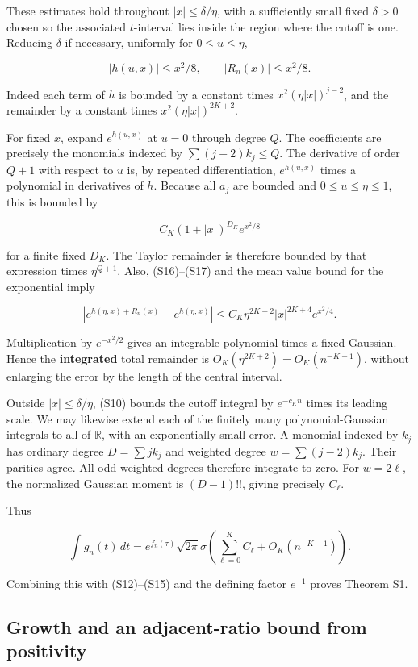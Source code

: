 These estimates hold throughout \(|x|\le\delta/\eta\), with a
sufficiently small fixed \(\delta>0\) chosen so the associated
\(t\)-interval lies inside the region where the cutoff is one. Reducing
\(\delta\) if necessary, uniformly for \(0\le u\le\eta\),

\[
 |h(u,x)|\le x^2/8,\qquad |R_n(x)|\le x^2/8. \tag{S17}
\]

Indeed each term of \(h\) is bounded by a constant times
\(x^2(\eta|x|)^{j-2}\), and the remainder by a constant times
\(x^2(\eta|x|)^{2K+2}\).

For fixed \(x\), expand \(e^{h(u,x)}\) at \(u=0\) through degree \(Q\).
The coefficients are precisely the monomials indexed by
\(\sum(j-2)k_j\le Q\). The derivative of order \(Q+1\) with respect to
\(u\) is, by repeated differentiation, \(e^{h(u,x)}\) times a polynomial
in derivatives of \(h\). Because all \(a_j\) are bounded and
\(0\le u\le\eta\le1\), this is bounded by

\[
 C_K(1+|x|)^{D_K}e^{x^2/8}
\]

for a finite fixed \(D_K\). The Taylor remainder is therefore bounded by
that expression times \(\eta^{Q+1}\). Also, (S16)--(S17) and the mean
value bound for the exponential imply

\[
 |e^{h(\eta,x)+R_n(x)}-e^{h(\eta,x)}|
 \le C_K\eta^{2K+2}|x|^{2K+4}e^{x^2/4}.
\]

Multiplication by \(e^{-x^2/2}\) gives an integrable polynomial times a
fixed Gaussian. Hence the \textbf{integrated} total remainder is
\(O_K(\eta^{2K+2})=O_K(n^{-K-1})\), without enlarging the error by the
length of the central interval.

Outside \(|x|\le\delta/\eta\), (S10) bounds the cutoff integral by
\(e^{-c_K n}\) times its leading scale. We may likewise extend each of
the finitely many polynomial-Gaussian integrals to all of \(\mathbb R\),
with an exponentially small error. A monomial indexed by \(k_j\) has
ordinary degree \(D=\sum jk_j\) and weighted degree \(w=\sum(j-2)k_j\).
Their parities agree. All odd weighted degrees therefore integrate to
zero. For \(w=2\ell\), the normalized Gaussian moment is \((D-1)!!\),
giving precisely \(C_\ell\).

Thus

\[
 \int g_n(t)\,dt=e^{f_n(\tau)}\sqrt{2\pi}\sigma
 \left(\sum_{\ell=0}^K C_\ell+O_K(n^{-K-1})\right).
\]

Combining this with (S12)--(S15) and the defining factor \(e^{-1}\)
proves Theorem S1.

\subsection{Growth and an adjacent-ratio bound from
positivity}\label{tcl:growth-and-an-adjacent-ratio-bound-from-positivity}

